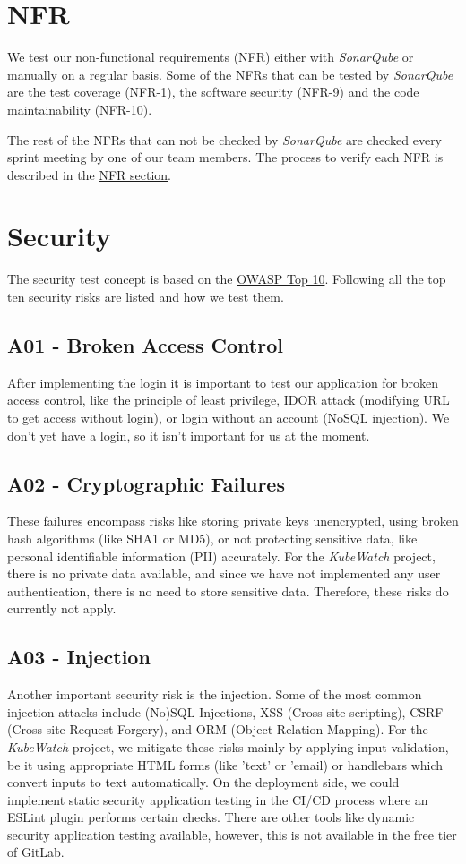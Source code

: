 \section{NFR}
We test our non-functional requirements (NFR) either with \textit{SonarQube} or manually on a regular basis.
Some of the NFRs that can be tested by \textit{SonarQube} are the test coverage (NFR-1),
the software security (NFR-9) and the code maintainability (NFR-10).

\noindent
The rest of the NFRs that can not be checked by \textit{SonarQube} are checked every sprint meeting by one of our team members.
The process to verify each NFR is described in the \hyperref[section:non-functional-requirements]{NFR section}.

\section{Security}
The security test concept is based on the \href{https://owasp.org/www-project-top-ten/}{OWASP Top 10}.
Following all the top ten security risks are listed and how we test them.

\subsection{A01 - Broken Access Control}
After implementing the login it is important to test our application for broken access control, like the principle of least privilege, IDOR attack (modifying URL to get access without login), or login without an account (NoSQL injection).
We don't yet have a login, so it isn't important for us at the moment.

\subsection{A02 - Cryptographic Failures}
These failures encompass risks like storing private keys unencrypted, using broken hash algorithms (like SHA1 or MD5), or not protecting sensitive data, like personal identifiable information (PII) accurately. For the \textit{KubeWatch} project, there is no private data available, and since we have not implemented any user authentication, there is no need to store sensitive data. Therefore, these risks do currently not apply.

\subsection{A03 - Injection}
Another important security risk is the injection. Some of the most common injection attacks include (No)SQL Injections, XSS (Cross-site scripting), CSRF (Cross-site Request Forgery), and ORM (Object Relation Mapping).
For the \textit{KubeWatch} project, we mitigate these risks mainly by applying input validation, be it using appropriate HTML forms (like 'text' or 'email) or handlebars which convert inputs to text automatically. On the deployment side, we could implement static security application testing in the CI/CD process where an ESLint plugin performs certain checks. There are other tools like dynamic security application testing available, however, this is not available in the free tier of GitLab.

